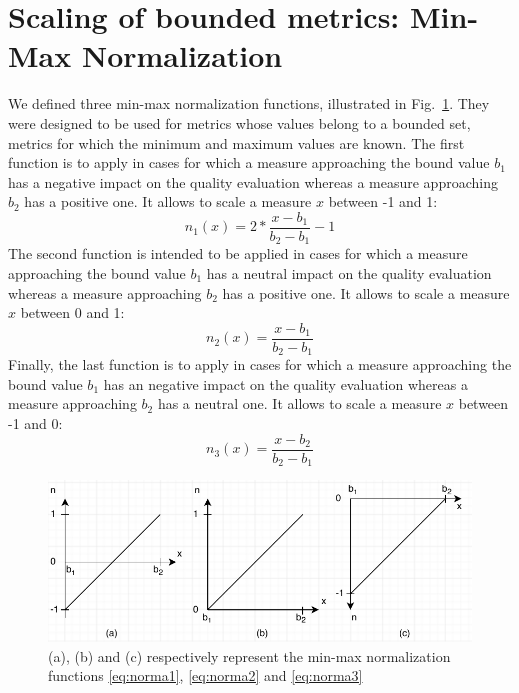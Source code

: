 \section{Scaling of bounded metrics: Min-Max Normalization} \label{subsubsec:norma} We defined three min-max normalization functions, illustrated in Fig.~\ref{fig:norma}. They were designed to be used for metrics whose values belong to a bounded set, \ie metrics for which the minimum and maximum values are known. The first function is to apply in cases for which a measure approaching the bound value $b_1$ has a negative impact on the quality evaluation whereas a measure approaching $b_2$ has a positive one. It allows to scale a measure $x$ between -1 and 1:
\begin{equation}\label{eq:norma1}
n_1(x) = 2 * \dfrac{x-b_1}{b_2-b_1} -1
\end{equation}
The second function is intended to be applied in cases for which a measure approaching the bound value $b_1$ has a neutral impact on the quality evaluation whereas a measure approaching $b_2$ has a positive one. It allows to scale a measure $x$ between 0 and 1:
\begin{equation}\label{eq:norma2}
n_2(x) = \dfrac{x-b_1}{b_2-b_1}
\end{equation}
Finally, the last function is to apply in cases for which a measure approaching the bound value $b_1$ has an negative impact on the quality evaluation whereas a measure approaching $b_2$ has a neutral one. It allows to scale a measure $x$ between -1 and 0:
\begin{equation}\label{eq:norma3}
n_3(x) = \dfrac{x-b_2}{b_2-b_1}
\end{equation}
\begin{figure}[!htp]
	\centering
	\includegraphics[width=\linewidth]{figures/chapter2/norma.pdf}
	\caption{(a), (b) and (c) respectively represent the min-max normalization functions \eqref{eq:norma1}, \eqref{eq:norma2} and \eqref{eq:norma3}}
	\label{fig:norma}
\end{figure}

